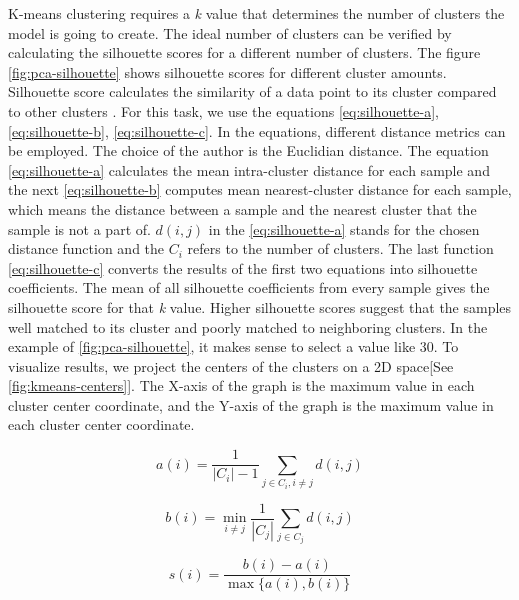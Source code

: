 K-means clustering requires a \textit{k} value that determines the number of clusters the model is going to create. The ideal number of clusters can be verified by calculating the silhouette scores for a different number of clusters. The figure \ref{fig:pca-silhouette} shows silhouette scores for different cluster amounts. Silhouette score calculates the similarity of a data point to its cluster compared to other clusters \parencite{rousseeuw1987silhouettes}. For this task, we use the equations \eqref{eq:silhouette-a}, \eqref{eq:silhouette-b}, \eqref{eq:silhouette-c}. In the equations, different distance metrics can be employed. The choice of the author is the Euclidian distance.  The equation \eqref{eq:silhouette-a} calculates the mean intra-cluster distance for each sample and the next \eqref{eq:silhouette-b} computes mean nearest-cluster distance for each sample, which means the distance between a sample and the nearest cluster that the sample is not a part of. $d(i, j)$ in the \eqref{eq:silhouette-a} stands for the chosen distance function and the $C_{i}$ refers to the number of clusters. The last function \eqref{eq:silhouette-c} converts the results of the first two equations into silhouette coefficients. The mean of all silhouette coefficients from every sample gives the silhouette score for that \textit{k} value. Higher silhouette scores suggest that the samples well matched to its cluster and poorly matched to neighboring clusters. In the example of \ref{fig:pca-silhouette}, it makes sense to select a value like 30. To visualize results, we project the centers of the clusters on a 2D space[See \ref{fig:kmeans-centers}]. The X-axis of the graph is the maximum value in each cluster center coordinate, and the Y-axis of the graph is the maximum value in each cluster center coordinate.

\begin{equation}
a(i)=\frac{1}{\left|C_{i}\right|-1} \sum_{j \in C_{i}, i \neq j} d(i, j)
\label{eq:silhouette-a}
\end{equation}

\begin{equation}
b(i)=\min _{i \neq j} \frac{1}{\left|C_{j}\right|} \sum_{j \in C_{j}} d(i, j)
\label{eq:silhouette-b}
\end{equation}

\begin{equation}
s(i)=\frac{b(i)-a(i)}{\max \{a(i), b(i)\}}
\label{eq:silhouette-c}
\end{equation}

